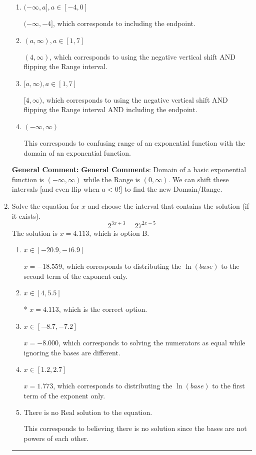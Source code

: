 \documentclass{extbook}[14pt]
\newcommand{\litem}[1]{\item #1

\rule{\textwidth}{0.4pt}}
\begin{document}
\begin{enumerate}
{\begin{enumerate}[label=\Alph*.]
* $(-\infty, -4)$, which is the correct option.
\item \( (-\infty, a], a \in [-4, 0] \)

$(-\infty, -4]$, which corresponds to including the endpoint.
\item \( (a, \infty), a \in [1, 7] \)

$(4, \infty)$, which corresponds to using the negative vertical shift AND flipping the Range interval.
\item \( [a, \infty), a \in [1, 7] \)

$[4, \infty)$, which corresponds to using the negative vertical shift AND flipping the Range interval AND including the endpoint.
\item \( (-\infty, \infty) \)

This corresponds to confusing range of an exponential function with the domain of an exponential function.
\end{enumerate}

\textbf{General Comment:} \textbf{General Comments}: Domain of a basic exponential function is $(-\infty, \infty)$ while the Range is $(0, \infty)$. We can shift these intervals [and even flip when $a<0$!] to find the new Domain/Range.
}
\litem{
Solve the equation for $x$ and choose the interval that contains the solution (if it exists).
\[ 2^{3x+3} = 27^{2x-5} \]The solution is \( x = 4.113 \), which is option B.\begin{enumerate}[label=\Alph*.]
\item \( x \in [-20.9, -16.9] \)

$x = -18.559$, which corresponds to distributing the $\ln(base)$ to the second term of the exponent only.
\item \( x \in [4, 5.5] \)

* $x = 4.113$, which is the correct option.
\item \( x \in [-8.7, -7.2] \)

$x = -8.000$, which corresponds to solving the numerators as equal while ignoring the bases are different.
\item \( x \in [1.2, 2.7] \)

$x = 1.773$, which corresponds to distributing the $\ln(base)$ to the first term of the exponent only.
\item \( \text{There is no Real solution to the equation.} \)

This corresponds to believing there is no solution since the bases are not powers of each other.
\end{enumerate}

}
\end{enumerate}
\end{document}
